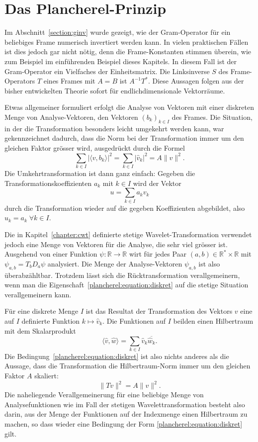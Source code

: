 %
%
%
\section{Das Plancherel-Prinzip
\label{section:plancherel}}
Im Abschnitt~\ref{section:ginv} wurde gezeigt, wie der Gram-Operator
für ein beliebiges Frame numerisch invertiert werden kann.
In vielen praktischen Fällen ist dies jedoch gar nicht nötig, denn
die Frame-Konstanten stimmen überein, wie zum Beispiel im einführenden
Beispiel dieses Kapitels.
In diesem Fall ist der Gram-Operator ein Vielfaches der Einheitsmatrix.
Die Linksinverse $S$ des Frame-Operators $T$ eines Frames mit $A=B$
ist $A^{-1}T^*$.
Diese Aussagen folgen aus der bisher entwickelten Theorie sofort
für endlichdimensionale Vektorräume.

Etwas allgemeiner formuliert erfolgt die Analyse von Vektoren
mit einer diskreten Menge von Analyse-Vektoren, den Vektoren $(b_k)_{k\in I}$
des Frames.
Die Situation, in der die Transformation besonders leicht umgekehrt werden
kann, war gekennzeichnet dadurch, dass die Norm bei der Transformation
immer um den gleichen Faktor grösser wird,
ausgedrückt durch die Formel
\begin{equation}
\sum_{k\in I} |\langle v,b_k\rangle|^2
=
\sum_{k\in I} |\hat{v}_k|^2
=
A\| v\|^2.
\label{plancherel:equation:diskret}
\end{equation}
Die Umkehrtransformation ist dann ganz einfach:
Gegeben die Transformationskoeffizienten $a_k$ mit $k\in I$ wird der Vektor
\[
u = \sum_{k\in I} a_k v_k
\]
durch die Transformation wieder auf die gegeben Koeffizienten abgebildet,
also $\hat{u}_k = a_k\;\forall k\in I$.

Die in Kapitel~\ref{chapter:cwt} definierte stetige Wavelet-Transformation
verwendet jedoch eine Menge von Vektoren für die Analyse, die sehr viel
grösser ist.
Ausgehend von einer Funktion $\psi\colon\mathbb R\to\mathbb R$
wirt für jedes Paar $(a,b)\in \mathbb{R}^*\times \mathbb R$ mit
$\psi_{a,b}=T_bD_a\psi$ analysiert.
Die Menge der Analyse-Vektoren $\psi_{a,b}$ ist also überabzähltbar.
Trotzdem lässt sich die Rücktransformation verallgemeinern, wenn 
man die Eigenschaft~\eqref{plancherel:equation:diskret} auf die
stetige Situation verallgemeinern kann.

Für eine diskrete Menge $I$ ist das Resultat der Transformation des Vektors
$v$ eine auf $I$ definierte Funktion $k\mapsto \hat{v}_k$.
Die Funktionen auf $I$ beilden einen Hilbertraum mit dem Skalarprodukt
\[
\langle \hat{v},\hat{w}\rangle
=
\sum_{k\in I} \hat{v}_k \overline{\hat{w}_k}.
\]
Die Bedingung~\eqref{plancherel:equation:diskret} ist also nichts anderes
als die Aussage, dass die Transformation die Hilbertraum-Norm immer um
den gleichen Faktor $A$ skaliert:
\[
\| Tv \|^2 = A \| v\|^2.
\]
Die naheliegende Verallgemeinerung für eine beliebige Menge von
Analysefunktionen wie im Fall der stetigen Wavelettransformation
besteht also darin, aus der Menge der Funktionen auf der Indexmenge
einen Hilbertraum zu machen, so dass wieder eine Bedingung der Form
\eqref{plancherel:equation:diskret} gilt.

